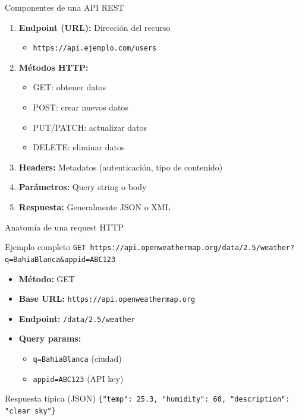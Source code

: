 \documentclass[aspectratio=169]{beamer}
\begin{document}
\begin{frame}{Componentes de una API REST}
\begin{enumerate}
    \item \textbf{Endpoint (URL):} Dirección del recurso
    \begin{itemize}
        \item \texttt{https://api.ejemplo.com/users}
    \end{itemize}
    
    \item \textbf{Métodos HTTP:}
    \begin{itemize}
        \item GET: obtener datos
        \item POST: crear nuevos datos
        \item PUT/PATCH: actualizar datos
        \item DELETE: eliminar datos
    \end{itemize}
    
    \item \textbf{Headers:} Metadatos (autenticación, tipo de contenido)
    
    \item \textbf{Parámetros:} Query string o body
    
    \item \textbf{Respuesta:} Generalmente JSON o XML
\end{enumerate}
\end{frame}

\begin{frame}{Anatomía de una request HTTP}
\begin{exampleblock}{Ejemplo completo}
\texttt{GET https://api.openweathermap.org/data/2.5/weather?q=BahiaBlanca\&appid=ABC123}
\end{exampleblock}

\begin{itemize}
    \item \textbf{Método:} GET
    \item \textbf{Base URL:} \texttt{https://api.openweathermap.org}
    \item \textbf{Endpoint:} \texttt{/data/2.5/weather}
    \item \textbf{Query params:}
    \begin{itemize}
        \item \texttt{q=BahiaBlanca} (ciudad)
        \item \texttt{appid=ABC123} (API key)
    \end{itemize}
\end{itemize}

\pause

\begin{block}{Respuesta típica (JSON)}
\texttt{\{"temp": 25.3, "humidity": 60, "description": "clear sky"\}}
\end{block}
\end{frame}
\end{document}
